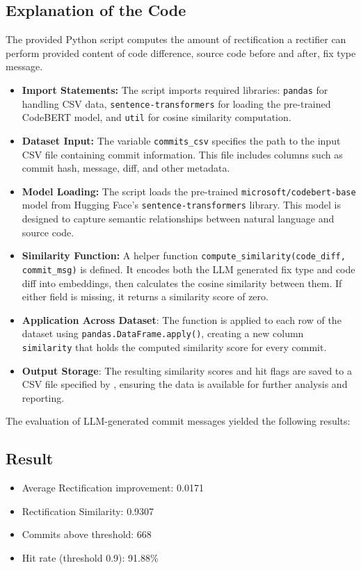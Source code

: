 \documentclass[12pt, a4paper]{report}
\begin{document}
\subsection*{Explanation of the Code}

The provided Python script computes the amount of rectification a rectifier can perform provided content of code difference, source code before and after, fix type message.

\begin{itemize}
    \item \textbf{Import Statements:} The script imports required libraries: \texttt{pandas} for handling CSV data, \texttt{sentence-transformers} for loading the pre-trained CodeBERT model, and \texttt{util} for cosine similarity computation.
    \item \textbf{Dataset Input:} The variable \texttt{commits\_csv} specifies the path to the input CSV file containing commit information. This file includes columns such as commit hash, message, diff, and other metadata.
    \item \textbf{Model Loading:} The script loads the pre-trained \texttt{microsoft/codebert-base} model from Hugging Face’s \texttt{sentence-transformers} library. This model is designed to capture semantic relationships between natural language and source code.
    \item \textbf{Similarity Function:} A helper function \texttt{compute\_similarity(code\_diff, commit\_msg)} is defined. It encodes both the LLM generated fix type and code diff into embeddings, then calculates the cosine similarity between them. If either field is missing, it returns a similarity score of zero.
    \item \textbf{Application Across Dataset}: The function is applied to each row of the dataset using \texttt{pandas.DataFrame.apply()}, creating a new column \texttt{similarity} that holds the computed similarity score for every commit.
    \item \textbf{Output Storage}: The resulting similarity scores and hit flags are saved to a CSV file specified by \texttt{}, ensuring the data is available for further analysis and reporting.
\end{itemize}

The evaluation of LLM-generated commit messages yielded the following results:

\subsection*{Result}
\begin{itemize}
    \item Average Rectification improvement: 0.0171
    \item Rectification Similarity: 0.9307
    \item Commits above threshold: 668
    \item Hit rate (threshold 0.9): 91.88\%
\end{itemize}
\end{document}
